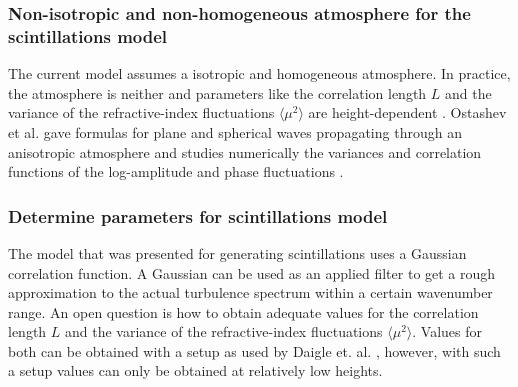 \subsubsection*{Non-isotropic and non-homogeneous atmosphere for the scintillations model}
The current model assumes a isotropic and homogeneous atmosphere. In practice,
the atmosphere is neither and parameters like the correlation length $L$ and the
variance of the refractive-index fluctuations $\langle \mu^2 \rangle$ are
height-dependent \cite{Krasnenko2013}. Ostashev et al. gave formulas for plane
\cite{Ostashev1997b} and spherical \cite{Ostashev1997c} waves propagating
through an anisotropic atmosphere and studies numerically the variances and
correlation functions of the log-amplitude and phase fluctuations
\cite{Ostashev2004}.

\subsubsection*{Determine parameters for scintillations model}
The model that was presented for generating scintillations uses a Gaussian
correlation function. A Gaussian can be used as an applied filter to get a rough
approximation to the actual turbulence spectrum within a certain wavenumber
range. An open question is how to obtain adequate values for the correlation
length $L$ and the variance of the refractive-index fluctuations $\langle \mu^2
\rangle$. Values for both can be obtained with a setup as used by Daigle et. al.
\cite{Daigle1983}, however, with such a setup values can only be obtained at
relatively low heights.




